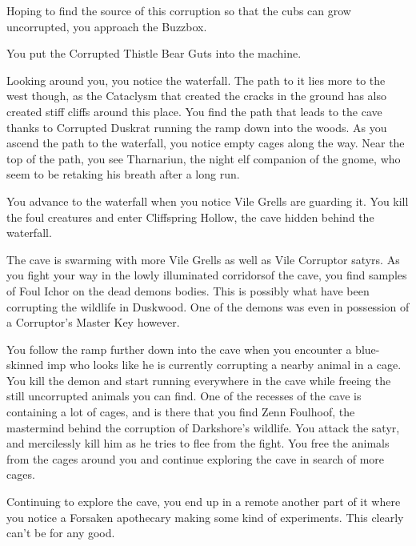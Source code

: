 Hoping to find the source of this corruption so that the cubs can grow uncorrupted, you approach the Buzzbox.


You put the Corrupted Thistle Bear Guts into the machine.



Looking around you, you notice the waterfall. The path to it lies more to the west though, as the Cataclysm that created the cracks in the ground has also created stiff cliffs around this place. You find the path that leads to the cave thanks to Corrupted Duskrat running the ramp down into the woods. As you ascend the path to the waterfall, you notice empty cages along the way. Near the top of the path, you see Tharnariun, the night elf companion of the gnome, who seem to be retaking his breath after a long run.


You advance to the waterfall when you notice Vile Grells are guarding it. You kill the foul creatures and enter Cliffspring Hollow, the cave hidden behind the waterfall.

The cave is swarming with more Vile Grells as well as Vile Corruptor satyrs. As you fight your way in the lowly illuminated corridorsof the cave, you find samples of Foul Ichor on the dead demons bodies. This is possibly what have been corrupting the wildlife in Duskwood. One of the demons was even in possession of a Corruptor's Master Key however.


You follow the ramp further down into the cave when you encounter a blue-skinned imp who looks like he is currently corrupting a nearby animal in a cage. You kill the demon and start running everywhere in the cave while freeing the still uncorrupted animals you can find. One of the recesses of the cave is containing a lot of cages, and is there that you find Zenn Foulhoof, the mastermind behind the corruption of Darkshore's wildlife. You attack the satyr, and mercilessly kill him as he tries to flee from the fight. You free the animals from the cages around you and continue exploring the cave in search of more cages.

Continuing to explore the cave, you end up in a remote another part of it where you notice a Forsaken apothecary making some kind of experiments. This clearly can't be for any good.

